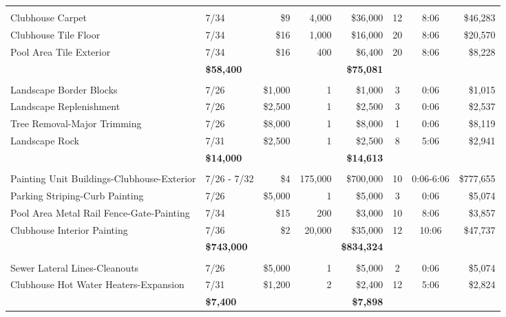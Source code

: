 \documentclass[11pt,letterpaper]{article}
\begin{document}
\begin{longtable}{p{4.2cm} p{1.6cm} r r r c c r}
\addlinespace[6pt]
\multicolumn{8}{l}{\textbf{Flooring}} \\
\rowcolor{blue!12} Clubhouse Carpet & 7/34 & \$9 & 4,000 & \$36,000 & 12 & 8:06 & \$46,283 \\
Clubhouse Tile Floor & 7/34 & \$16 & 1,000 & \$16,000 & 20 & 8:06 & \$20,570 \\
\rowcolor{blue!12} Pool Area Tile Exterior & 7/34 & \$16 & 400 & \$6,400 & 20 & 8:06 & \$8,228 \\
\addlinespace[1pt] \multicolumn{4}{r}{} & \textbf{\$58,400} & & & \textbf{\$75,081} \\
\addlinespace[6pt]
\multicolumn{8}{l}{\textbf{Landscape}} \\
Landscape Border Blocks & 7/26 & \$1,000 & 1 & \$1,000 & 3 & 0:06 & \$1,015 \\
\rowcolor{blue!12} Landscape Replenishment & 7/26 & \$2,500 & 1 & \$2,500 & 3 & 0:06 & \$2,537 \\
Tree Removal-Major Trimming & 7/26 & \$8,000 & 1 & \$8,000 & 1 & 0:06 & \$8,119 \\
\rowcolor{blue!12} Landscape Rock & 7/31 & \$2,500 & 1 & \$2,500 & 8 & 5:06 & \$2,941 \\
\addlinespace[1pt] \multicolumn{4}{r}{} & \textbf{\$14,000} & & & \textbf{\$14,613} \\
\addlinespace[6pt]
\multicolumn{8}{l}{\textbf{Painting}} \\
Painting Unit Buildings-Clubhouse-Exterior & 7/26 - 7/32 & \$4 & 175,000 & \$700,000 & 10 & 0:06-6:06 & \$777,655 \\
\rowcolor{blue!12} Parking Striping-Curb Painting & 7/26 & \$5,000 & 1 & \$5,000 & 3 & 0:06 & \$5,074 \\
Pool Area Metal Rail Fence-Gate-Painting & 7/34 & \$15 & 200 & \$3,000 & 10 & 8:06 & \$3,857 \\
\rowcolor{blue!12} Clubhouse Interior Painting & 7/36 & \$2 & 20,000 & \$35,000 & 12 & 10:06 & \$47,737 \\
\addlinespace[1pt] \multicolumn{4}{r}{} & \textbf{\$743,000} & & & \textbf{\$834,324} \\
\addlinespace[6pt]
\multicolumn{8}{l}{\textbf{Plumbing}} \\
Sewer Lateral Lines-Cleanouts & 7/26 & \$5,000 & 1 & \$5,000 & 2 & 0:06 & \$5,074 \\
\rowcolor{blue!12} Clubhouse Hot Water Heaters-Expansion & 7/31 & \$1,200 & 2 & \$2,400 & 12 & 5:06 & \$2,824 \\
\addlinespace[1pt] \multicolumn{4}{r}{} & \textbf{\$7,400} & & & \textbf{\$7,898} \\

\end{longtable}
\end{document}
